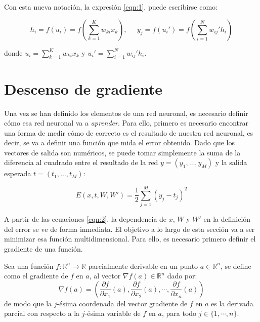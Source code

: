 Con esta nueva notación, la expresión \ref{eqn:1}, puede escribirse como:

\begin{equation}
    \label{eqn:2}
    h_i = f(u_i) = f\left(\sum_{k=1}^K w_{ki} x_k\right), \;\;\;\;\;
    y_j = f(u_i') = f\left(\sum_{i=1}^N w_{ij}' h_i\right)
\end{equation}

donde $u_i=\sum_{k=1}^K w_{ki} x_k$ y $u_i'=\sum_{i=1}^N w_{ij}' h_i$.

\section{Descenso de gradiente}

Una vez se han definido los elementos de una red neuronal, es necesario definir cómo esa red neuronal
va a \textit{aprender}. Para ello, primero es necesario encontrar una forma de medir cómo de correcto
es el resultado de nuestra red neuronal, es decir, se va a definir una función que mida el error obtenido.
Dado que los vectores de salida son numéricos, se puede tomar simplemente la suma de la diferencia al
cuadrado entre el resultado de la red $y = (y_1, \ldots, y_M)$ y la salida esperada $t = (t_1, \ldots, t_M)$:

\begin{equation}
    \label{eqn:3}
    E(x, t, W, W') = \frac{1}{2}\sum_{j=1}^M(y_j-t_j)^2
\end{equation}

A partir de las ecuaciones \ref{eqn:2}, la dependencia de $x$, $W$ y $W'$ en la definición del error se
ve de forma inmediata. El objetivo a lo largo de esta sección va a ser minimizar esa función multidimensional.
Para ello, es necesario primero definir el gradiente de una función.

\begin{definition}[Gradiente]
    Sea una función $f: \mathbb{R}^n \longrightarrow \mathbb{R}$ parcialmente derivable en un punto $a\in\mathbb{R}^n$, se define como
    el gradiente de $f$ en $a$, al vector $\nabla f(a)\in\mathbb{R}^n$ dado por:
    \[
        \nabla f(a) = \left( \frac{\partial f}{\partial x_1} (a), \frac{\partial f}{\partial x_2} (a), \cdots, \frac{\partial f}{\partial x_n} (a)  \right)
    \]
    de modo que la $j$-ésima coordenada del vector gradiente de $f$ en $a$ es la derivada parcial con respecto a la $j$-ésima variable de $f$ en $a$, para todo $j\in\{1, \cdots, n\}$.
\end{definition}



